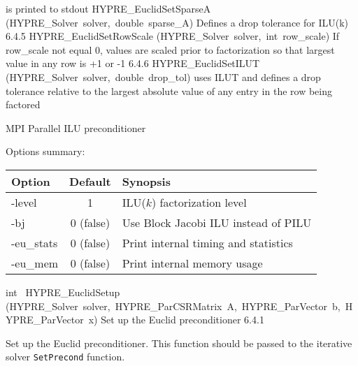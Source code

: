 \documentclass{article}
\begin{document}
\begin{cxxentry}
\begin{cxxentry}
\begin{cxxnames}
{is printed to stdout}
        {}
\label{cxx.6.4.12}
        {HYPRE\_EuclidSetSparseA}
        {(HYPRE\_Solver\ solver,\ double\ sparse\_A)}
        {
Defines a drop tolerance for ILU(k)}
        {6.4.5}
        {HYPRE\_EuclidSetRowScale}
        {(HYPRE\_Solver\ solver,\ int\ row\_scale)}
        {
If row\_scale not equal 0, values are scaled prior to factorization
so that largest value in any row is +1 or -1}
        {6.4.6}
        {HYPRE\_EuclidSetILUT}
        {(HYPRE\_Solver\ solver,\ double\ drop\_tol)}
        {
uses ILUT and defines a drop tolerance relative to the largest
absolute value of any entry in the row being factored}
        {}
\label{cxx.6.4.13}
\end{cxxnames}
\begin{cxxdoc}


MPI Parallel ILU preconditioner 

Options summary:
\begin{center}
\begin{tabular}{|l|c|l|}
\hline
Option & Default & Synopsis \\
\hline
-level    & 1 & ILU($k$) factorization level \\ \hline
-bj       & 0 (false) & Use Block Jacobi ILU instead of PILU \\ \hline
-eu\_stats & 0 (false) & Print  internal timing and statistics \\ \hline
-eu\_mem   & 0 (false) & Print  internal memory usage \\ \hline
\end{tabular}
\end{center}

\end{cxxdoc}
\begin{cxxfunction}
{int\ }
        {HYPRE\_EuclidSetup}
        {(HYPRE\_Solver\ solver,\ HYPRE\_ParCSRMatrix\ A,\ HYPRE\_ParVector\ b,\ HYPRE\_ParVector\ x)}
        {
Set up the Euclid preconditioner}
        {6.4.1}
\begin{cxxdoc}

Set up the Euclid preconditioner.  This function should be passed
to the iterative solver {\tt SetPrecond} function.



\end{cxxdoc}
\end{cxxfunction}
\end{cxxentry}
\end{cxxentry}
\end{document}
